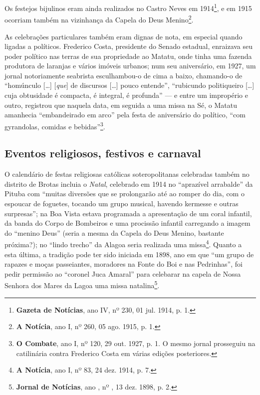 Os festejos bijulinos eram ainda realizados no Castro Neves em 1914\footnote{\textbf{Gazeta de Notícias}, ano IV, nº 230, 01 jul. 1914, p. 1.}, e em 1915 ocorriam também na vizinhança da Capela do Deus Menino\footnote{\textbf{A Notícia}, ano I, nº 260, 05 ago. 1915, p. 1.}.

As celebrações particulares também eram dignas de nota, em especial quando ligadas a políticos. Frederico Costa, presidente do Senado estadual, enraizava seu poder político nas terras de sua propriedade ao Matatu, onde tinha uma fazenda produtora de laranjas e vários imóveis urbanos; num seu aniversário, em 1927, um jornal notoriamente seabrista esculhambou-o de cima a baixo, chamando-o de ``homúnculo [\dots] [\textit{que}] de discursos [\dots] pouco entende'', ``rubicundo politiqueiro [\dots] cuja obtusidade é compacta, é integral, é profunda'' --- e entre um impropério e outro, registrou que naquela data, em seguida a uma missa na Sé, o Matatu amanhecia ``embandeirado em arco'' pela festa de aniversário do político, ``com gyrandolas, comidas e bebidas''\footnote{\textbf{O Combate}, ano I, nº 120, 29 out. 1927, p. 1. O mesmo jornal prosseguiu na catilinária contra Frederico Costa em várias edições posteriores.}.

\subsection{Eventos religiosos, festivos e carnaval}

O calendário de festas religiosas católicas soteropolitanas celebradas também no distrito de Brotas incluia o \textit{Natal}, celebrado em 1914 no ``aprazível arrabalde'' da Pituba com ``muitas diversões que se prolongarão até ao romper do dia, com o espoucar de foguetes, tocando um grupo musical, havendo kermesse e outras surpresas''; na Boa Vista estava programada a apresentação de um coral infantil, da banda do Corpo de Bombeiros e uma procissão infantil carregando a imagem do ``menino Deus'' (seria a mesma da Capela do Deus Menino, bastante próxima?); no ``lindo trecho'' da Alagoa seria realizada uma missa\footnote{\textbf{A Notícia}, ano I, nº 83, 24 dez. 1914, p. 7.}. Quanto a esta última, a tradição pode ter sido iniciada em 1898, ano em que ``um grupo de rapazes e moças passeiantes, moradores na Fonte do Boi e nas Pedrinhas'', foi pedir permissão ao ``coronel Juca Amaral'' para celebarar na capela de Nossa Senhora dos Mares da Lagoa uma missa natalina\footnote{\textbf{Jornal de Notícias}, ano , nº , 13 dez. 1898, p. 2.}.

